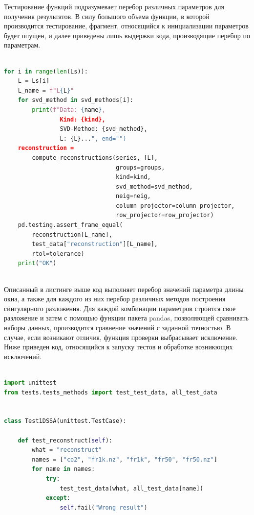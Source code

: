 \documentclass[specialist,
			   substylefile = spbu_report.rtx,
			   subf,href,colorlinks=true, 12pt]{disser}
\begin{document}
Тестирование функций подразумевает перебор различных параметров для получения результатов. В силу большого объема функции, в которой производится тестирование, фрагмент, относящийся к инициализации параметров будет опущен, и далее приведены лишь выдержки кода, производящие перебор по параметрам.

\begin{lstlisting}[language=Python, caption=Перебор параметров восстановления и проверка результатов на правильность.]
	
for i in range(len(Ls)):
    L = Ls[i]
    L_name = f"L{L}"
    for svd_method in svd_methods[i]:
        print(f"Data: {name},
                Kind: {kind}, 
                SVD-Method: {svd_method},
                L: {L}...", end="")
    reconstruction = 
        compute_reconstructions(series, [L], 
                                groups=groups, 
                                kind=kind, 
                                svd_method=svd_method,
                                neig=neig, 
                                column_projector=column_projector,
                                row_projector=row_projector)
    pd.testing.assert_frame_equal(
        reconstruction[L_name], 
        test_data["reconstruction"][L_name],
        rtol=tolerance)
    print("OK")
	
\end{lstlisting}

Описанный в листинге выше код выполняет перебор значений параметра длины окна, а также для каждого из них перебор различных методов построения сингулярного разложения. Для каждой комбинации параметров строится свое разложение и затем с помощью функции пакета pandas, позволяющей сравнивать наборы данных, производится сравнение значений с заданной точностью. В случае, если возникают отличия, функция проверки выбрасывает исключение. Ниже приведен код, относящийся к запуску тестов и обработке возникющих исключений.

\begin{lstlisting}[language=Python, caption=Запуск тестов правильности восстановления временного ряда и обработка исключений.]

import unittest
from tests.tests_methods import test_test_data, all_test_data


class Test1DSSA(unittest.TestCase):

    def test_reconstruct(self):
        what = "reconstruct"
        names = ["co2", "fr1k.nz", "fr1k", "fr50", "fr50.nz"]
        for name in names:
            try:
                test_test_data(what, all_test_data[name])
            except:
                self.fail("Wrong result")
	
\end{lstlisting}
\end{document}
